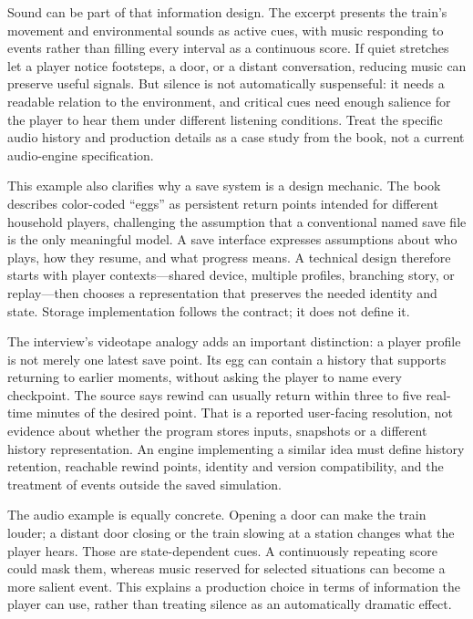 Sound can be part of that information design. The excerpt presents the train's movement and environmental sounds as active cues, with music responding to events rather than filling every interval as a continuous score. If quiet stretches let a player notice footsteps, a door, or a distant conversation, reducing music can preserve useful signals. But silence is not automatically suspenseful: it needs a readable relation to the environment, and critical cues need enough salience for the player to hear them under different listening conditions. Treat the specific audio history and production details as a case study from the book, not a current audio-engine specification.

This example also clarifies why a save system is a design mechanic. The book describes color-coded ``eggs'' as persistent return points intended for different household players, challenging the assumption that a conventional named save file is the only meaningful model. A save interface expresses assumptions about who plays, how they resume, and what progress means. A technical design therefore starts with player contexts---shared device, multiple profiles, branching story, or replay---then chooses a representation that preserves the needed identity and state. Storage implementation follows the contract; it does not define it.

The interview's videotape analogy adds an important distinction: a player profile is not merely one latest save point. Its egg can contain a history that supports returning to earlier moments, without asking the player to name every checkpoint. The source says rewind can usually return within three to five real-time minutes of the desired point. That is a reported user-facing resolution, not evidence about whether the program stores inputs, snapshots or a different history representation. An engine implementing a similar idea must define history retention, reachable rewind points, identity and version compatibility, and the treatment of events outside the saved simulation.

The audio example is equally concrete. Opening a door can make the train louder; a distant door closing or the train slowing at a station changes what the player hears. Those are state-dependent cues. A continuously repeating score could mask them, whereas music reserved for selected situations can become a more salient event. This explains a production choice in terms of information the player can use, rather than treating silence as an automatically dramatic effect.


